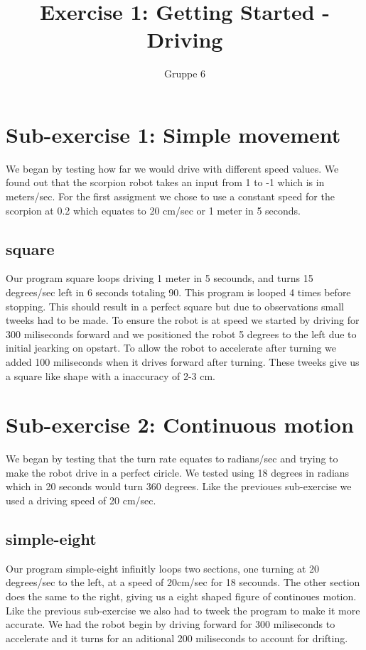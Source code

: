 \documentclass[a4paper,12pt]{article}
\title{Exercise 1: Getting Started - Driving}
\author{Gruppe 6}
\begin{document}
\maketitle

\section{ Sub-exercise 1: Simple movement}

We began by testing how far we would drive with different speed values. We found out that the scorpion robot takes an input from 1 to -1 which is in meters/sec. For the first assigment we chose to use a constant speed for the scorpion at 0.2 which equates to 20 cm/sec or 1 meter in 5 seconds.

\subsection{square}

Our program square loops driving 1 meter in 5 secounds,  and turns 15 degrees/sec left in 6 seconds totaling 90. This program is looped 4 times before stopping. This should result in a perfect square but due to observations small tweeks had to be made.
\newline
\newline
To ensure the robot is at speed we started by driving for 300 miliseconds forward and we positioned the robot 5 degrees to the left due to initial jearking on opstart.
\newline
\newline
To allow the robot to accelerate after turning we added 100 miliseconds when it drives forward after turning. These tweeks give us a square like shape with a inaccuracy of 2-3 cm.

\newpage 

\section{ Sub-exercise 2: Continuous motion}

We began by testing that the turn rate equates to radians/sec and trying to make the robot drive in a perfect ciricle. We tested using 18 degrees in radians which in 20 seconds would turn 360 degrees. Like the previoues sub-exercise we used a driving speed of 20 cm/sec.

\subsection{simple-eight}

Our program simple-eight infinitly loops two sections, one turning at 20 degrees/sec to the left, at a speed of 20cm/sec for 18 secounds. The other section does the same to the right, giving us a eight shaped figure of continoues motion.
\newline
\newline
Like the previous sub-exercise we also had to tweek the program to make it more accurate. We had the robot begin by driving forward for 300 miliseconds to accelerate and it turns for an aditional 200 miliseconds to account for drifting.
\end{document}
